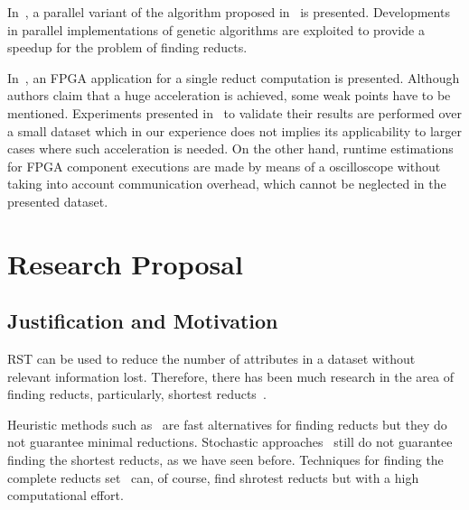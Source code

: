 \documentclass[authoryear,11pt]{elsarticle}
\begin{document}
  In~\citep{Wroblewski98}, a parallel variant of the algorithm proposed in~\citep{Wroblewski95} is presented.
  Developments in parallel implementations of genetic algorithms are exploited to provide a speedup for the 
  problem of finding reducts.
  
  In~\citep{Grzes13,Kopczynski14}, an FPGA application for a single reduct computation is presented. Although
  authors claim that a huge acceleration is achieved, some weak points have to be mentioned. Experiments presented 
  in~\citep{Kopczynski14} to validate their results are performed over a small dataset which in our experience 
  does not implies its applicability to larger cases where such acceleration is needed. On the other hand, 
  runtime estimations for FPGA component executions are made by means of a oscilloscope without taking into 
  account communication overhead, which cannot be neglected in the presented dataset.

\clearpage
\section{Research Proposal}\label{ResearchProposal} 

\subsection{Justification and Motivation}\label{Justification}
  RST can be used to reduce the number of attributes in a dataset without relevant information lost. 
  Therefore, there has been much research in the area of finding reducts, particularly, shortest 
  reducts~\citep{Jensen14}. 
  
  Heuristic methods such as~\citep{Chouchoulas01,Jensen04,Zhong01} are fast alternatives for finding 
  reducts but they do not guarantee minimal reductions. Stochastic approaches~\citep{Wroblewski95,Jensen03,
  Chen10,Wang07} still do not guarantee finding the shortest reducts, as we have seen before. Techniques 
  for finding the complete reducts set~\citep{Starzyk99,WangP07} can, of course, find 
  shrotest reducts but with a high computational effort.
  
\end{document}
